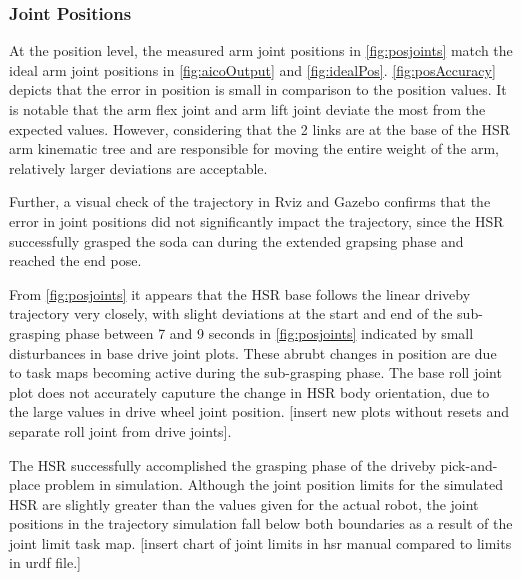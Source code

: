 \documentclass[12pt]{article}
\begin{document}
        \subsubsection{Joint Positions} 
            At the position level, the measured arm joint positions in \autoref{fig:posjoints} match the ideal arm joint positions in \autoref{fig:aicoOutput} and \autoref{fig:idealPos}. \autoref{fig:posAccuracy} depicts that the error in position is small in comparison to the position values. It is notable that the arm flex joint and arm lift joint deviate the most from the expected values. However, considering that the 2 links are at the base of the HSR arm kinematic tree and are responsible for moving the entire weight of the arm, relatively larger deviations are acceptable.
            \par Further, a visual check of the trajectory in Rviz and Gazebo confirms that the error in joint positions did not significantly impact the trajectory, since the HSR successfully grasped the soda can during the extended grapsing phase and reached the end pose. \par From \autoref{fig:posjoints} it appears that the HSR base follows the linear driveby trajectory very closely, with slight deviations at the start and end of the sub-grasping phase between 7 and 9 seconds in \autoref{fig:posjoints} indicated by small disturbances in base drive joint plots. These abrubt changes in position are due to task maps becoming active during the sub-grasping phase. The base roll joint plot does not accurately caputure the change in HSR body orientation, due to the large values in drive wheel joint position. [insert new plots without resets and separate roll joint from drive joints].
            \par The HSR successfully accomplished the grasping phase of the driveby pick-and-place problem in simulation. Although the joint position limits for the simulated HSR are slightly greater than the values given for the actual robot, the joint positions in the trajectory simulation fall below both boundaries as a result of the joint limit task map. [insert chart of joint limits in hsr manual compared to limits in urdf file.]
\end{document}
